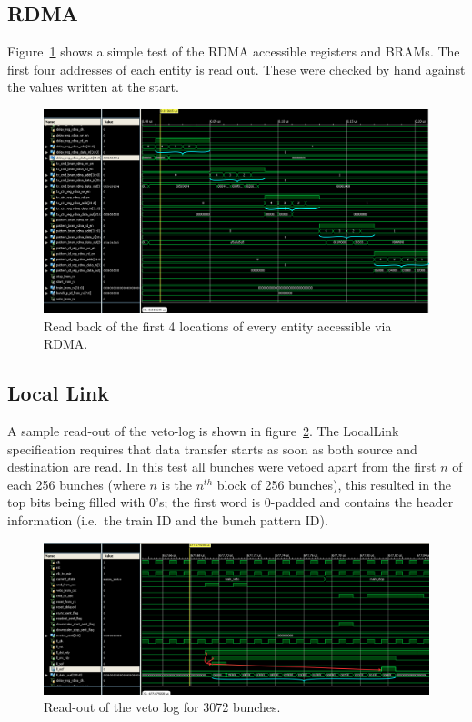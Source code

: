 \subsection{RDMA} %
\label{sec:rdma}
Figure~\ref{fig:isim_rdma} shows a simple test of the RDMA accessible registers and BRAMs. The first four addresses of each entity is read out. These were checked by hand against the values written at the start.
\begin{figure}[htbp]
  \centering
  \includegraphics[width=\textwidth]{images/isim/edited/rdma.png}
  \caption{Read back of the first 4 locations of every entity accessible via RDMA.}
  \label{fig:isim_rdma}
\end{figure}
    
\subsection{Local Link} %
\label{sec:local_link}
A sample read-out of the veto-log is shown in figure~\ref{fig:isim_locallink}. The LocalLink specification requires that data transfer starts as soon as both source and destination are read. In this test all bunches were vetoed apart from the first \(n\) of each 256 bunches (where \( n\) is the \( n^{th} \) block of 256 bunches), this resulted in the top bits being filled with 0's; the first word is 0-padded and contains the header information (i.e.\ the train ID and the bunch pattern ID).
\begin{figure}[htbp]
  \centering
  \includegraphics[width=\textwidth]{images/isim/edited/locallink.png}
  \caption{Read-out of the veto log for 3072 bunches.}
  \label{fig:isim_locallink}
\end{figure}
    
